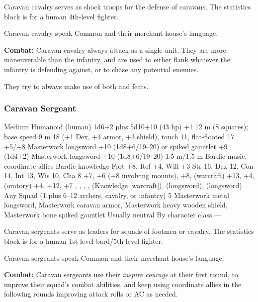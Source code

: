 Caravan cavalry serves as shock troops for the defense of caravans. The statistics block is for a human 4th-level fighter.

Caravan cavalry speak Common and their merchant house's language.

\textbf{Combat:} Caravan cavalry always attack as a single unit. They are more maneuverable than the infantry, and are used to either flank whatever the infantry is defending against, or to chase any potential enemies.

They try to always make use of both  and  feats.

\subsubsection{Caravan Sergeant}
\begin{MonsterStats}
{Medium Humanoid (human)}
{1d6+2 plus 5d10+10 (43 hp)}
{+1}
{12 m (8 squares); base speed 9 m}
{18 (+1 Dex, +4 armor, +3 shield), touch 11, flat-flooted 17}
{+5/+8}
{Masterwork longsword +10 (1d8+6/19--20) or spiked gauntlet +9 (1d4+2)}
{Masterwork longsword +10 (1d8+6/19--20)}
{1.5 m/1.5 m}
{Bardic music, coordinate allies}
{Bardic knowledge}
{Fort +8, Ref +4, Will +3}
{Str 16, Dex 12, Con 14, Int 13, Wis 10, Cha 8}
{
	 +7,
	 +6 (+8 involving mounts),
	 +8,
	 (warcraft) +13,
	 +4,
	 (oratory) +4,
	 +12,
	 +7
}
{
	,
	,
	,
	,
	 (Knowledge [warcraft]),
	 (longsword),
	 (longsword)
}
{Any}
{Squad (1 plus 6--12 archers, cavalry, or infantry)}
{5}
{
	Masterwork metal longsword,
	Masterwork caravan armor,
	Masterwork heavy wooden shield,
	Masterwork bone spiked gauntlet
}
{Usually neutral}
{By character class}
{---}
\end{MonsterStats}

Caravan sergeants serve as leaders for squads of footmen or cavalry. The statistics block is for a human 1st-level bard/5th-level fighter.

Caravan sergeants speak Common and their merchant house's language.

\textbf{Combat:} Caravan sergeants use their \emph{inspire courage} at their first round, to improve their squad's combat abilities, and keep using coordinate allies in the following rounds improving attack rolls or AC as needed.

